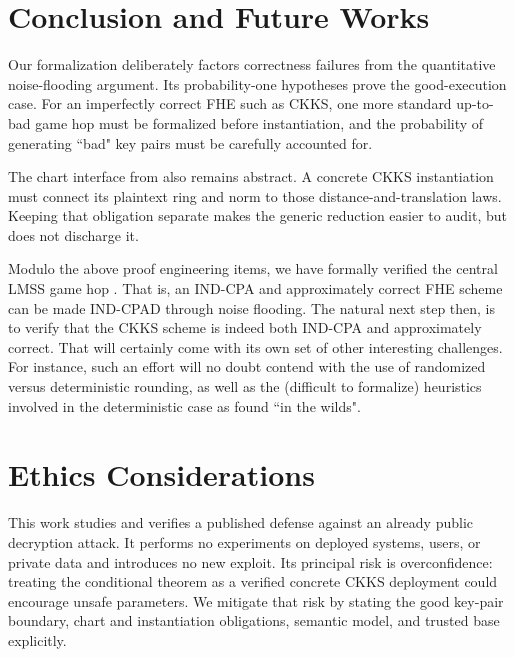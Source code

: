 \section{Conclusion and Future Works}
\label{sec:limitations}

Our formalization deliberately factors correctness failures from the
quantitative noise-flooding argument.
Its probability-one hypotheses prove the good-execution case.
For an imperfectly correct FHE such as CKKS, one more standard up-to-bad game hop must be formalized before instantiation, and the probability of generating ``bad" key pairs must be carefully accounted for.

The chart interface from  also remains abstract.
A concrete CKKS instantiation must connect its plaintext ring and norm to those
distance-and-translation laws.
Keeping that obligation separate makes the generic reduction easier to audit,
but does not discharge it.

Modulo the above proof engineering items, we have formally verified the central LMSS game hop \cite{lmss}.
That is, an IND-CPA and approximately correct FHE scheme can be made IND-CPAD through noise flooding.
The natural next step then, is to verify that the CKKS scheme is indeed both IND-CPA and approximately correct.
That will certainly come with its own set of other interesting challenges.
For instance, such an effort will no doubt contend with the use of randomized versus deterministic rounding, as well as the (difficult to formalize) heuristics involved in the deterministic case as found ``in the wilds".

\section*{Ethics Considerations}

This work studies and verifies a published defense against an already public decryption attack.
It performs no experiments on deployed systems, users, or private data and introduces no new exploit.
Its principal risk is overconfidence: treating the conditional theorem as a verified concrete CKKS deployment could encourage unsafe parameters.
We mitigate that risk by stating the good key-pair boundary, chart and instantiation obligations, semantic model, and trusted base explicitly.
